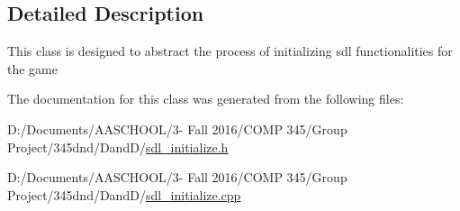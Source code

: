 \subsection{Detailed Description}
This class is designed to abstract the process of initializing sdl functionalities for the game 

The documentation for this class was generated from the following files\+:\begin{DoxyCompactItemize}
\item 
D\+:/\+Documents/\+A\+A\+S\+C\+H\+O\+O\+L/3-\/ Fall 2016/\+C\+O\+M\+P 345/\+Group Project/345dnd/\+Dand\+D/\hyperlink{sdl__initialize_8h}{sdl\+\_\+initialize.\+h}\item 
D\+:/\+Documents/\+A\+A\+S\+C\+H\+O\+O\+L/3-\/ Fall 2016/\+C\+O\+M\+P 345/\+Group Project/345dnd/\+Dand\+D/\hyperlink{sdl__initialize_8cpp}{sdl\+\_\+initialize.\+cpp}\end{DoxyCompactItemize}
